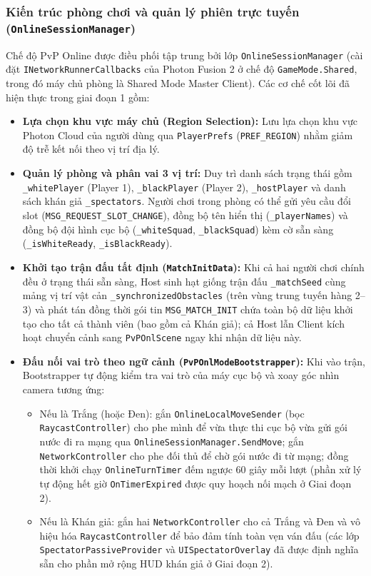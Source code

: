 \subsubsection{Kiến trúc phòng chơi và quản lý phiên trực tuyến (\texttt{OnlineSessionManager})}
Chế độ PvP Online được điều phối tập trung bởi lớp \texttt{OnlineSessionManager} (cài đặt \texttt{INetworkRunnerCallbacks} của Photon Fusion 2 \cite{photon_fusion} ở chế độ \texttt{GameMode.Shared}, trong đó máy chủ phòng là Shared Mode Master Client). Các cơ chế cốt lõi đã hiện thực trong giai đoạn 1 gồm:
\begin{itemize}
    \item \textbf{Lựa chọn khu vực máy chủ (Region Selection):} Lưu lựa chọn khu vực Photon Cloud của người dùng qua \texttt{PlayerPrefs} (\texttt{PREF\_REGION}) nhằm giảm độ trễ kết nối theo vị trí địa lý.
    \item \textbf{Quản lý phòng và phân vai 3 vị trí:} Duy trì danh sách trạng thái gồm \texttt{\_whitePlayer} (Player 1), \texttt{\_blackPlayer} (Player 2), \texttt{\_hostPlayer} và danh sách khán giả \texttt{\_spectators}. Người chơi trong phòng có thể gửi yêu cầu đổi slot (\texttt{MSG\_REQUEST\_SLOT\_CHANGE}), đồng bộ tên hiển thị (\texttt{\_playerNames}) và đồng bộ đội hình cục bộ (\texttt{\_whiteSquad}, \texttt{\_blackSquad}) kèm cờ sẵn sàng (\texttt{\_isWhiteReady}, \texttt{\_isBlackReady}).
    \item \textbf{Khởi tạo trận đấu tất định (\texttt{MatchInitData}):} Khi cả hai người chơi chính đều ở trạng thái sẵn sàng, Host sinh hạt giống trận đấu \texttt{\_matchSeed} cùng mảng vị trí vật cản \texttt{\_synchronizedObstacles} (trên vùng trung tuyến hàng 2--3) và phát tán đồng thời gói tin \texttt{MSG\_MATCH\_INIT} chứa toàn bộ dữ liệu khởi tạo cho tất cả thành viên (bao gồm cả Khán giả); cả Host lẫn Client kích hoạt chuyển cảnh sang \texttt{PvPOnlScene} ngay khi nhận dữ liệu này.
    \item \textbf{Đấu nối vai trò theo ngữ cảnh (\texttt{PvPOnlModeBootstrapper}):} Khi vào trận, Bootstrapper tự động kiểm tra vai trò của máy cục bộ và xoay góc nhìn camera tương ứng:
    \begin{itemize}
        \item Nếu là Trắng (hoặc Đen): gắn \texttt{OnlineLocalMoveSender} (bọc \texttt{RaycastController}) cho phe mình để vừa thực thi cục bộ vừa gửi gói nước đi ra mạng qua \texttt{OnlineSessionManager.SendMove}; gắn \texttt{NetworkController} cho phe đối thủ để chờ gói nước đi từ mạng; đồng thời khởi chạy \texttt{OnlineTurnTimer} đếm ngược 60 giây mỗi lượt (phần xử lý tự động hết giờ \texttt{OnTimerExpired} được quy hoạch nối mạch ở Giai đoạn 2).
        \item Nếu là Khán giả: gắn hai \texttt{NetworkController} cho cả Trắng và Đen và vô hiệu hóa \texttt{RaycastController} để bảo đảm tính toàn vẹn ván đấu (các lớp \texttt{SpectatorPassiveProvider} và \texttt{UISpectatorOverlay} đã được định nghĩa sẵn cho phần mở rộng HUD khán giả ở Giai đoạn 2).
    \end{itemize}
\end{itemize}

